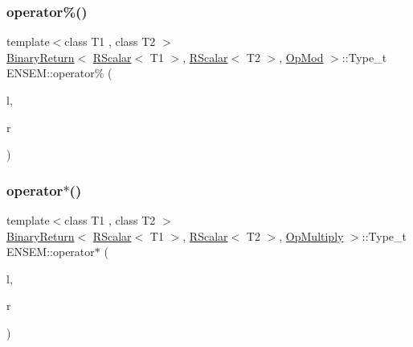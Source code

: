 \subsubsection{\texorpdfstring{operator\%()}{operator\%()}}
{\footnotesize\ttfamily template$<$class T1 , class T2 $>$ \\
\mbox{\hyperlink{structENSEM_1_1BinaryReturn}{Binary\+Return}}$<$ \mbox{\hyperlink{classENSEM_1_1RScalar}{R\+Scalar}}$<$ T1 $>$, \mbox{\hyperlink{classENSEM_1_1RScalar}{R\+Scalar}}$<$ T2 $>$, \mbox{\hyperlink{structENSEM_1_1OpMod}{Op\+Mod}} $>$\+::Type\+\_\+t E\+N\+S\+E\+M\+::operator\% (\begin{DoxyParamCaption}\item[{const \mbox{\hyperlink{classENSEM_1_1RScalar}{R\+Scalar}}$<$ T1 $>$ \&}]{l,  }\item[{const \mbox{\hyperlink{classENSEM_1_1RScalar}{R\+Scalar}}$<$ T2 $>$ \&}]{r }\end{DoxyParamCaption})\hspace{0.3cm}{\ttfamily [inline]}}

\mbox{\label{group__rscalar_gadab7ad151ff9bea909186af226815d96}} 
\subsubsection{\texorpdfstring{operator$\ast$()}{operator*()}}
{\footnotesize\ttfamily template$<$class T1 , class T2 $>$ \\
\mbox{\hyperlink{structENSEM_1_1BinaryReturn}{Binary\+Return}}$<$ \mbox{\hyperlink{classENSEM_1_1RScalar}{R\+Scalar}}$<$ T1 $>$, \mbox{\hyperlink{classENSEM_1_1RScalar}{R\+Scalar}}$<$ T2 $>$, \mbox{\hyperlink{structENSEM_1_1OpMultiply}{Op\+Multiply}} $>$\+::Type\+\_\+t E\+N\+S\+E\+M\+::operator$\ast$ (\begin{DoxyParamCaption}\item[{const \mbox{\hyperlink{classENSEM_1_1RScalar}{R\+Scalar}}$<$ T1 $>$ \&}]{l,  }\item[{const \mbox{\hyperlink{classENSEM_1_1RScalar}{R\+Scalar}}$<$ T2 $>$ \&}]{r }\end{DoxyParamCaption})\hspace{0.3cm}{\ttfamily [inline]}}

\mbox{\label{group__rscalar_ga2ad5c813070059a7a12cee82d5e2bbae}} 
